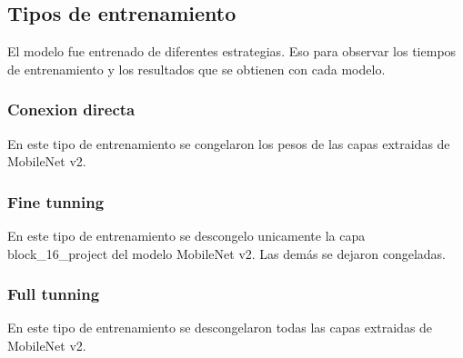 \subsection{Tipos de entrenamiento}

El modelo fue entrenado de diferentes estrategias. Eso para observar los tiempos de entrenamiento y los resultados que se obtienen con cada modelo.

\subsubsection{Conexion directa}

En este tipo de entrenamiento se congelaron los pesos de las capas extraidas de MobileNet v2.

\subsubsection{Fine tunning}

En este tipo de entrenamiento se descongelo unicamente la capa block\_16\_project del modelo MobileNet v2. Las demás se dejaron congeladas.

\subsubsection{Full tunning}

En este tipo de entrenamiento se descongelaron todas las capas extraidas de MobileNet v2.